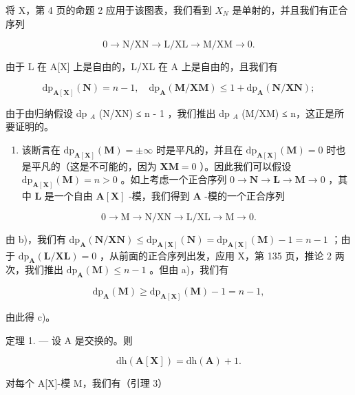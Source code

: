 将 X，第 4 页的命题 2 应用于该图表，我们看到 \(X_{N}\) 是单射的，并且我们有正合序列

\[
0 \rightarrow \mathrm{N} / \mathrm{XN} \rightarrow \mathrm{L} / \mathrm{XL} \rightarrow \mathrm{M} / \mathrm{XM} \rightarrow 0.
\]

由于 L 在 A{[}X{]} 上是自由的，L/XL 在 A 上是自由的，且我们有

\[
\mathrm{dp} _ {\mathbf {A} [ \mathbf {X} ]} (\mathbf {N}) = n - 1, \quad \mathrm{dp} _ {\mathbf {A}} (\mathbf {M} / \mathbf {X M}) \leqslant 1 + \mathrm{dp} _ {\mathbf {A}} (\mathbf {N} / \mathbf {X N});
\]

由于由归纳假设 dp \(_{A}\) (N/XN) ≤ n - 1 ，我们推出 dp \(_{A}\) (M/XM) ≤ n，这正是所要证明的。

\begin{enumerate}
\def\labelenumi{\alph{enumi})}
\setcounter{enumi}{2}
\tightlist
\item
  该断言在 \(\mathrm{dp}_{\mathbf{A}[\mathbf{X}]}(\mathbf{M}) = \pm \infty\) 时是平凡的，并且在 \(\mathrm{dp}_{\mathbf{A}[\mathbf{X}]}(\mathbf{M}) = 0\) 时也是平凡的（这是不可能的，因为 \(\mathbf{XM} = 0\) ）。因此我们可以假设 \(\mathrm{dp}_{\mathbf{A}[\mathbf{X}]}(\mathbf{M}) = n > 0\) 。如上考虑一个正合序列 \(0 \to \mathbf{N} \to \mathbf{L} \to \mathbf{M} \to 0\) ，其中 \(\mathbf{L}\) 是一个自由 \(\mathbf{A}[\mathbf{X}]\) -模，我们得到 \(\mathbf{A}\) -模的一个正合序列
\end{enumerate}

\[
0 \rightarrow \mathrm{M} \rightarrow \mathrm{N} / \mathrm{XN} \rightarrow \mathrm{L} / \mathrm{XL} \rightarrow \mathrm{M} \rightarrow 0.
\]

由 b)，我们有 \(\mathrm{dp}_{\mathbf{A}}(\mathbf{N} / \mathbf{X}\mathbf{N}) \leqslant \mathrm{dp}_{\mathbf{A}[\mathbf{X}]}(\mathbf{N}) = \mathrm{dp}_{\mathbf{A}[\mathbf{X}]}(\mathbf{M}) - 1 = n - 1\) ；由于 \(\mathrm{dp}_{\mathbf{A}}(\mathbf{L} / \mathbf{XL}) = 0\) ，从前面的正合序列出发，应用 X，第 135 页，推论 2 两次，我们推出 \(\mathrm{dp}_{\mathbf{A}}(\mathbf{M}) \leqslant n - 1\) 。但由 a)，我们有

\[
\mathrm{dp} _ {\mathbf {A}} (\mathbf {M}) \geqslant \mathrm{dp} _ {\mathbf {A} [ \mathbf {X} ]} (\mathbf {M}) - 1 = n - 1,
\]

由此得 c)。

定理 1. --- 设 A 是交换的。则

\[
\mathrm{dh} (\mathbf {A} [ \mathbf {X} ]) = \mathrm{dh} (\mathbf {A}) + 1.
\]

对每个 A{[}X{]}-模 M，我们有（引理 3）

